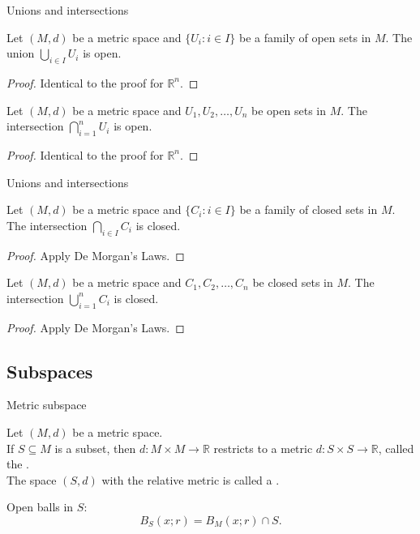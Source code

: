 \documentclass{beamer}
\begin{document}
\begin{frame}{Unions and intersections}
\pause
\begin{thm}
Let $(M,d)$ be a metric space and  $\{U_i: i\in I\}$ be a family of open sets in $M$.
The union $\bigcup_{i\in I} U_i$ is open.
\end{thm}
\pause
\begin{proof}
Identical to the proof for $\mathbb{R}^n$.
\end{proof}
\pause
\begin{thm}
Let $(M,d)$ be a metric space and $U_1,U_2,\dots, U_n$ be open sets in $M$.
The intersection $\bigcap_{i=1}^n U_i$ is open.
\end{thm}
\pause
\begin{proof}
Identical to the proof for $\mathbb{R}^n$.
\end{proof}
\end{frame}

\begin{frame}{Unions and intersections}
\pause
\begin{thm}
Let $(M,d)$ be a metric space and  $\{C_i: i\in I\}$ be a family of closed sets in $M$.
The intersection $\bigcap_{i\in I} C_i$ is closed.
\end{thm}
\pause
\begin{proof}
Apply De Morgan's Laws.
\end{proof}
\pause
\begin{thm}
Let $(M,d)$ be a metric space and $C_1,C_2,\dots, C_n$ be closed sets in $M$.
The intersection $\bigcup_{i=1}^n C_i$ is closed.
\end{thm}
\pause
\begin{proof}
Apply De Morgan's Laws.
\end{proof}
\end{frame}

\subsection{Subspaces}

\begin{frame}{Metric subspace}
\begin{defn}
Let $(M,d)$ be a metric space.\\
\pause
If $S\subseteq M$ is a subset, then $d: M\times M\rightarrow \mathbb{R}$ restricts to a metric $d: S\times S\rightarrow \mathbb{R}$, called the .\\
\pause
The space $(S,d)$ with the relative metric is called a .
\end{defn}
\pause
Open balls in $S$:
$$B_S(x; r) = B_M(x; r) \cap S.$$
\end{frame}
\end{document}

